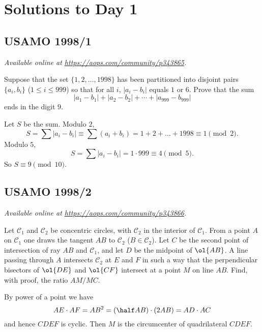 \documentclass[11pt]{scrartcl}
\begin{document}
\section{Solutions to Day 1}
\subsection{USAMO 1998/1}
\textsl{Available online at \url{https://aops.com/community/p343865}.}
\begin{mdframed}[style=mdpurplebox,frametitle={Problem statement}]
Suppose that the set $\{1,2,\dots, 1998\}$
has been partitioned into disjoint pairs $\{a_i,b_i\}$ ($1\leq i\leq 999$)
so that for all $i$, $|a_i-b_i|$ equals $1$ or $6$.
Prove that the sum
\[ |a_1-b_1|+|a_2-b_2|+\dotsb +|a_{999}-b_{999}|  \]
ends in the digit $9$.
\end{mdframed}
Let $S$ be the sum.
Modulo $2$,
\[ S = \sum |a_i-b_i| \equiv \sum (a_i+b_i)
  = 1 + 2 + \dots + 1998 \equiv 1 \pmod 2. \]
Modulo $5$,
\[ S = \sum |a_i-b_i| = 1 \cdot 999 \equiv 4 \pmod 5. \]
So $S \equiv 9 \pmod{10}$.
\pagebreak

\subsection{USAMO 1998/2}
\textsl{Available online at \url{https://aops.com/community/p343866}.}
\begin{mdframed}[style=mdpurplebox,frametitle={Problem statement}]
Let $\mathcal C_1$ and $\mathcal C_2$ be concentric circles, with
$\mathcal C_2$ in the interior of $\mathcal C_1$.
From a point $A$ on $\mathcal C_1$ one draws the tangent $AB$
to $\mathcal C_2$ ($B\in \mathcal C_2$).
Let $C$ be the second point of intersection of ray $AB$ and
$\mathcal C_1$, and let $D$ be the midpoint of $\ol{AB}$.
A line passing through $A$ intersects $\mathcal C_2$ at $E$ and $F$
in such a way that the perpendicular bisectors of $\ol{DE}$ and $\ol{CF}$
intersect at a point $M$ on line $AB$.
Find, with proof, the ratio $AM/MC$.
\end{mdframed}
By power of a point we have
\[ AE \cdot AF = AB^2
  = \left( \half AB \right) \cdot \left( 2AB \right)
  = AD \cdot AC \]
and hence $CDEF$ is cyclic.
Then $M$ is the circumcenter of quadrilateral $CDEF$.
\end{document}
